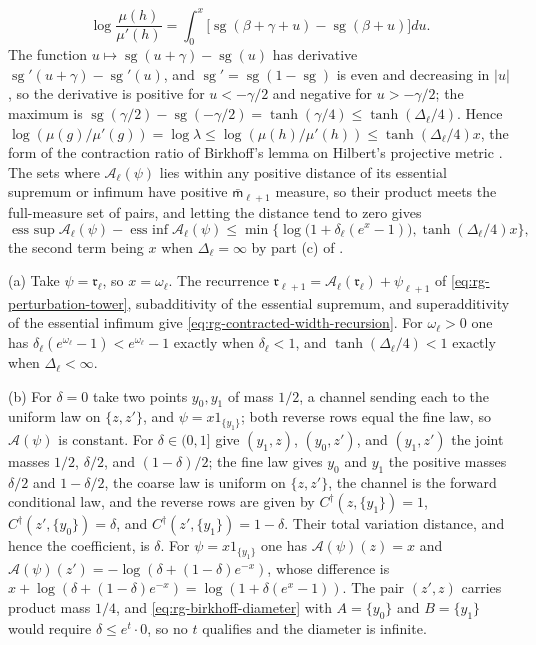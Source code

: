 \begin{equation*}
\log\frac{\mu(h)}{\mu'(h)}
=\int_0^x\bigl[\operatorname{sg}(\beta+\gamma+u)-\operatorname{sg}(\beta+u)\bigr]du.
\end{equation*}
The function $u\mapsto\operatorname{sg}(u+\gamma)-\operatorname{sg}(u)$ has
derivative $\operatorname{sg}'(u+\gamma)-\operatorname{sg}'(u)$, and
$\operatorname{sg}'=\operatorname{sg}(1-\operatorname{sg})$ is even and decreasing in
$\lvert u\rvert$, so the derivative is positive for $u<-\gamma/2$ and negative for
$u>-\gamma/2$; the maximum is
$\operatorname{sg}(\gamma/2)-\operatorname{sg}(-\gamma/2)=\tanh(\gamma/4)\le\tanh(\Delta_\ell/4)$.
Hence $\log(\mu(g)/\mu'(g))=\log\lambda\le\log(\mu(h)/\mu'(h))\le\tanh(\Delta_\ell/4)x$,
the form of the contraction ratio of Birkhoff's lemma on Hilbert's projective metric
\citep[Sec.~4, Lemma~1, Eq.~(9a)]{Birkhoff1957}. The sets
where $\mathcal A_\ell(\psi)$ lies within any positive distance of its essential
supremum or infimum have positive $\bar{\mathsf m}_{\ell+1}$ measure, so their product
meets the full-measure set of pairs, and letting the distance tend to zero gives
\begin{equation*}
\operatorname*{ess~sup}\mathcal A_\ell(\psi)-\operatorname*{ess~inf}\mathcal A_\ell(\psi)
\le\min\bigl\{\log\bigl(1+\delta_\ell(e^x-1)\bigr),\tanh(\Delta_\ell/4)x\bigr\},
\end{equation*}
the second term being $x$ when $\Delta_\ell=\infty$ by part (c) of
.

(a) Take $\psi=\mathfrak r_\ell$, so $x=\omega_\ell$. The recurrence
$\mathfrak r_{\ell+1}=\mathcal A_\ell(\mathfrak r_\ell)+\psi_{\ell+1}$ of
\eqref{eq:rg-perturbation-tower}, subadditivity of the essential supremum, and
superadditivity of the essential infimum give
\eqref{eq:rg-contracted-width-recursion}. For $\omega_\ell>0$ one has
$\delta_\ell(e^{\omega_\ell}-1)<e^{\omega_\ell}-1$ exactly when $\delta_\ell<1$, and
$\tanh(\Delta_\ell/4)<1$ exactly when $\Delta_\ell<\infty$.

(b) For $\delta=0$ take two points $y_0,y_1$ of mass $1/2$, a channel sending each
to the uniform law on $\{z,z'\}$, and $\psi=x1_{\{y_1\}}$; both reverse rows equal the
fine law, so $\mathcal A(\psi)$ is constant. For $\delta\in(0,1]$ give
$(y_1,z)$, $(y_0,z')$, and $(y_1,z')$ the joint masses $1/2$, $\delta/2$, and
$(1-\delta)/2$; the fine law gives $y_0$ and $y_1$ the positive masses $\delta/2$
and $1-\delta/2$, the coarse law is uniform on $\{z,z'\}$, the channel is the
forward conditional law, and the reverse rows are given by $C^\dagger(z,\{y_1\})=1$, $C^\dagger(z',\{y_0\})=\delta$, and
$C^\dagger(z',\{y_1\})=1-\delta$. Their total variation distance, and hence the coefficient, is $\delta$. For
$\psi=x1_{\{y_1\}}$ one has $\mathcal A(\psi)(z)=x$ and
$\mathcal A(\psi)(z')=-\log(\delta+(1-\delta)e^{-x})$, whose difference is
$x+\log(\delta+(1-\delta)e^{-x})=\log(1+\delta(e^x-1))$. The pair $(z',z)$ carries
product mass $1/4$, and \eqref{eq:rg-birkhoff-diameter} with $A=\{y_0\}$ and
$B=\{y_1\}$ would require $\delta\le e^t\cdot0$, so no $t$ qualifies and the
diameter is infinite.

